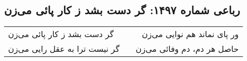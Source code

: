 \begin{center}
\section*{رباعی شماره ۱۴۹۷: گر دست بشد ز کار پائی می‌زن}
\label{sec:1497}
\begin{longtable}{l p{0.5cm} r}
گر دست بشد ز کار پائی می‌زن
&&
ور پای نماند هم نوایی می‌زن
\\
گر نیست ترا به عقل رایی می‌زن
&&
حاصل هر دم، دم وفائی می‌زن
\\
\end{longtable}
\end{center}
